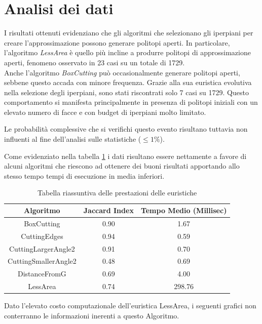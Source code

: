 \pagebreak
\section{Analisi dei dati} 
\label{sec:Analisi dei dati}
I risultati ottenuti evidenziano che gli algoritmi che selezionano gli iperpiani 
per creare l'approssimazione possono generare politopi aperti. In particolare, 
l'algoritmo \textit{LessArea} è quello più incline a produrre politopi di approssimazione aperti, 
fenomeno osservato in 23 casi su un totale di 1729.\\
Anche l'algoritmo \textit{BoxCutting} può occasionalmente generare politopi aperti, 
sebbene questo accada con minore frequenza. 
Grazie alla sua euristica evolutiva nella selezione degli iperpiani, 
sono stati riscontrati solo 7 casi su 1729. Questo comportamento si manifesta principalmente 
in presenza di politopi iniziali con un elevato numero di facce e con budget di iperpiani 
molto limitato.

Le probabilità complessive che si verifichi questo evento risultano tuttavia 
non influenti al fine dell'analisi sulle statistiche ($\leq 1\%$).

Come evidenziato nella tabella \ref{tab:results} i dati risultano essere nettamente a favore di
alcuni algoritmi che riescono ad ottenere dei buoni risultati apportando allo stesso
tempo tempi di esecuzione in media inferiori.

\begin{table}[h] 
    \centering
    \begin{tabular}{|c|c|c|}
        \hline
        Algoritmo & Jaccard Index & Tempo Medio (Millisec) \\
        \hline
        BoxCutting              & 0.90  & 1.67\\
        CuttingEdges            & 0.94  & 0.59\\ 
        CuttingLargerAngle2     & 0.91  & 0.70 \\
        CuttingSmallerAngle2    & 0.48  & 0.69 \\
        DistanceFromG           & 0.69  & 4.00 \\
        LessArea                & 0.74  & 298.76 \\
        \hline
    \end{tabular}
    \caption{Tabella riassuntiva delle prestazioni delle euristiche} 
    \label{tab:results}
\end{table} 

Dato l'elevato costo computazionale dell'euristica LessArea, i seguenti grafici
non conterranno le informazioni inerenti a questo Algoritmo.

